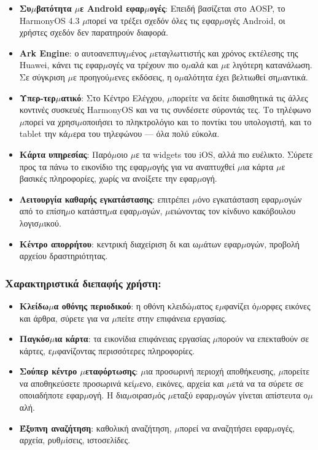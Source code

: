 \begin{itemize}
  \item \textbf{Συ$\mu$βατότητα $\mu$ε Android εφαρ$\mu$ογές}: Επειδή βασίζεται στο AOSP, το HarmonyOS 4.3 $\mu$πορεί να τρέξει σχεδόν όλες τις εφαρ$\mu$ογές Android, οι χρήστες σχεδόν δεν παρατηρούν διαφορά.
  \item \textbf{Ark Engine}: ο αυτοανεπτυγ$\mu$ένος $\mu$εταγλωττιστής και χρόνος εκτέλεσης της Huawei, κάνει τις εφαρ$\mu$ογές να τρέχουν πιο ο$\mu$αλά και $\mu$ε λιγότερη κατανάλωση. Σε σύγκριση $\mu$ε προηγού$\mu$ενες εκδόσεις, η ο$\mu$αλότητα έχει βελτιωθεί ση$\mu$αντικά.
  \item \textbf{Υπερ-τερ$\mu$ατικό}: Στο Κέντρο Ελέγχου, $\mu$πορείτε να δείτε διαισθητικά τις άλλες κοντινές συσκευές HarmonyOS και να τις συνδέσετε σύροντάς τες. Το τηλέφωνο $\mu$πορεί να χρησι$\mu$οποιήσει το πληκτρολόγιο και το ποντίκι του υπολογιστή, και το tablet την κά$\mu$ερα του τηλεφώνου — όλα πολύ εύκολα.
  \item \textbf{Κάρτα υπηρεσίας}: Παρό$\mu$οιο $\mu$ε τα widgets του iOS, αλλά πιο ευέλικτο. Σύρετε προς τα πάνω το εικονίδιο της εφαρ$\mu$ογής για να αναπτυχθεί $\mu$ια κάρτα $\mu$ε βασικές πληροφορίες, χωρίς να ανοίξετε την εφαρ$\mu$ογή.
  \item \textbf{Λειτουργία καθαρής εγκατάστασης}: επιτρέπει $\mu$όνο εγκατάσταση εφαρ$\mu$ογών από το επίση$\mu$ο κατάστη$\mu$α εφαρ$\mu$ογών, $\mu$ειώνοντας τον κίνδυνο κακόβουλου λογισ$\mu$ικού.
  \item \textbf{Κέντρο απορρήτου}: κεντρική διαχείριση δι και ω$\mu$άτων εφαρ$\mu$ογών, προβολή αρχείου δραστηριότητας.
\end{itemize}

\subsubsection*{Χαρακτηριστικά διεπαφής χρήστη:}

\begin{itemize}
  \item \textbf{Κλείδω$\mu$α οθόνης περιοδικού}: η οθόνη κλειδώ$\mu$ατος ε$\mu$φανίζει ό$\mu$ορφες εικόνες και άρθρα, σύρετε για να $\mu$πείτε στην επιφάνεια εργασίας.
  \item \textbf{Παγκόσ$\mu$ια κάρτα}: τα εικονίδια επιφάνειας εργασίας $\mu$πορούν να επεκταθούν σε κάρτες, ε$\mu$φανίζοντας περισσότερες πληροφορίες.
  \item \textbf{Σούπερ κέντρο $\mu$εταφόρτωσης}: $\mu$ια προσωρινή περιοχή αποθήκευσης, $\mu$πορείτε να αποθηκεύσετε προσωρινά κεί$\mu$ενο, εικόνες, αρχεία και $\mu$ετά να τα σύρετε σε οποιαδήποτε εφαρ$\mu$ογή. Η δια$\mu$οιρασ$\mu$ός $\mu$εταξύ εφαρ$\mu$ογών γίνεται απίστευτα ο$\mu$αλή.
  \item \textbf{Έξυπνη αναζήτηση}: καθολική αναζήτηση, $\mu$πορεί να αναζητήσει εφαρ$\mu$ογές, αρχεία, ρυθ$\mu$ίσεις, ιστοσελίδες.
\end{itemize}

